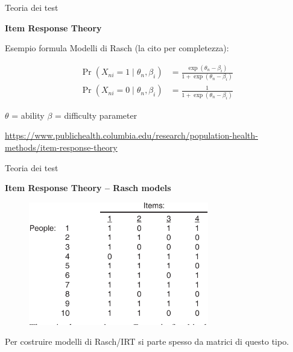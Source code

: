 \documentclass[
  ignorenonframetext,
]{beamer}
\begin{document}
\begin{frame}{Teoria dei test}
\label{teoria-dei-test-5}
\begin{center}
  \textbf{Item Response Theory}
\end{center}

Esempio formula Modelli di Rasch (la cito per completezza): \vspace{2em}

\small
\begin{align}
  \Pr(X_{ni}=1 \mid \theta_n, \beta_i)
  &= \frac{\exp(\theta_n - \beta_i)}{1 + \exp(\theta_n - \beta_i)}
  \label{eq:rasch_prob}
  \\
  \Pr(X_{ni}=0 \mid \theta_n, \beta_i) &= \frac{1}{1 + \exp(\theta_n - \beta_i)}
  \label{eq:rasch_prob0}
\end{align}

$\theta$ = ability
$\beta$ = difficulty parameter

\vspace{2em}

\href{https://www.publichealth.columbia.edu/research/population-health-methods/item-response-theory}{\ul{https://www.publichealth.columbia.edu/research/population-health-methods/item-response-theory}}
\end{frame}

\begin{frame}{Teoria dei test}
\label{teoria-dei-test-6}
\begin{center}
  \textbf{Item Response Theory – Rasch models}
\end{center}

\begin{figure}
  \includegraphics[width=0.7\textwidth]{Figures/Rasch_matrix.png}
\end{figure}

Per costruire modelli di Rasch/IRT si parte spesso da matrici di questo
tipo.
\end{frame}
\end{document}
